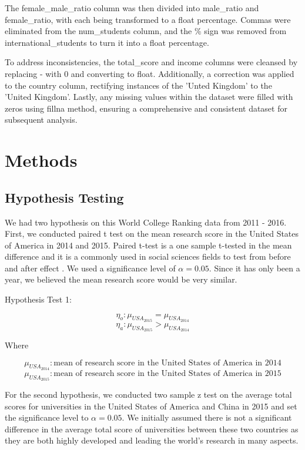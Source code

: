 \documentclass[a4paper]{article}
\begin{document}
The female\_male\_ratio column was then divided into male\_ratio and female\_ratio, with each being transformed to a float percentage. Commas were eliminated from the num\_students column, and the \% sign was removed from international\_students to turn it into a float percentage.

To address inconsistencies, the total\_score and income columns were cleansed by replacing - with 0 and converting to float. Additionally, a correction was applied to the country column, rectifying instances of the 'Unted Kingdom' to the 'United Kingdom'. Lastly, any missing values within the dataset were filled with zeros using fillna method, ensuring a comprehensive and consistent dataset for subsequent analysis.

\section*{Methods}
\subsection* {Hypothesis Testing}
We had two hypothesis on this World College Ranking data from 2011 - 2016. First, we conducted paired t test on the mean research score in the United States of America in 2014 and 2015.  Paired t-test is a one sample t-tested in the mean difference and it is a commonly used in social sciences fields to test from before and after effect \cite{hedberg_ayers_2015}. We used a significance level of $\alpha = 0.05$. Since it has only been a year, we believed the mean research score would be very similar.\newline

Hypothesis Test 1:

$$\eta_o: \mu_{USA_{2015}} = \mu_{USA_{2014}}$$
$$\eta_a: \mu_{USA_{2015}} > \mu_{USA_{2014}}$$

Where

$$\mu_{USA_{2014}}: \text{mean of research score in the United States of America in 2014}$$
$$\mu_{USA_{2015}}: \text{mean of research score in the United States of America in 2015} $$\newline


For the second hypothesis, we conducted two sample z test on the average total scores for universities in the United States of America and China in 2015 and set the significance level to $\alpha = 0.05$. We initially assumed there is not a significant difference in the average total score of universities between these two countries as they are both highly developed and leading the world's research in many aspects.\newline 
\end{document}
